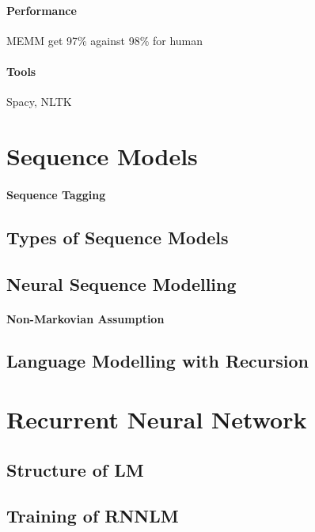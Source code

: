 			\paragraph*{Performance}
				MEMM get 97\% against 98\% for human

			\paragraph*{Tools}
				Spacy, NLTK

	\section{Sequence Models}

		\paragraph*{Sequence Tagging}

		\subsection{Types of Sequence Models}

		\subsection{Neural Sequence Modelling}

				\paragraph*{Non-Markovian Assumption}

		\subsection{Language Modelling with Recursion}

	\section{Recurrent Neural Network}
		\subsection{Structure of LM}

		\subsection{Training of RNNLM}

